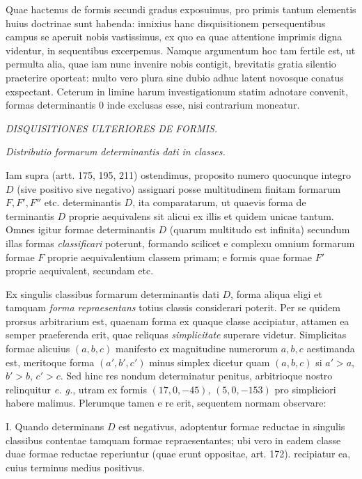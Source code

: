 Quae hactenus de formis secundi gradus exposuimus, pro primis tantum elementis
huius doctrinae sunt habenda: innixius hanc disquisitionem persequentibus campus
se aperuit nobis vastissimus, ex quo ea quae attentione imprimis digna videntur,
in sequentibus excerpemus. Namque argumentum hoc tam fertile est, ut permulta alia,
quae iam nunc invenire nobis contigit, brevitatis gratia silentio praeterire
oporteat: multo vero plura sine dubio adhuc latent novosque conatus exspectant.
Ceterum in limine harum investigationum statim adnotare convenit, formas
determinantis $0$ inde exclusas esse, nisi contrarium moneatur.

\begin{center}
\textit{DISQUISITIONES ULTERIORES DE FORMIS.}
\end{center}

\begin{center}
\textit{Distributio formarum determinantis dati in classes.}
\end{center}

Iam supra (artt. 175, 195, 211) ostendimus, proposito numero quocunque integro
$D$ (sive positivo sive negativo) assignari posse multitudinem finitam formarum
$F,F',F''$ etc. determinantis $D$, ita comparatarum, ut quaevis forma de%
%
terminantis $D$ proprie aequivalens sit alicui ex illis et quidem unicae tantum.
Omnes igitur formae determinantis $D$ (quarum multitudo est infinita) secundum
illas formas \textit{classificari} poterunt, formando scilicet e complexu omnium
formarum formae $F$ proprie aequivalentium classem primam; e formis quae formae
$F'$ proprie aequivalent, secundam etc.

Ex singulis classibus formarum determinantis dati $D$, forma aliqua eligi et
tamquam \textit{forma repraesentans} totius classis considerari poterit. Per se
quidem prorsus arbitrarium est, quaenam forma ex quaque classe accipiatur, attamen
ea semper praeferenda erit, quae reliquas \textit{simplicitate} superare videtur.
Simplicitas formae alicuius $(a,b,c)$ manifesto ex magnitudine numerorum
$a,b,c$ aestimanda est, meritoque forma $(a',b',c')$ minus simplex dicetur
quam $(a,b,c)$ si $a'>a$, $b'>b$, $c'>c$. Sed hinc res nondum
determinatur penitus, arbitrioque nostro relinquitur \textit{e. g.}, utram ex
formis $(17,0,-45)$, $(5,0,-153)$ pro simpliciori habere malimus.
Plerumque tamen e re erit, sequentem normam observare:

I. Quando determinans $D$ est negativus, adoptentur formae reductae in singulis
classibus contentae tamquam formae repraesentantes; ubi vero in eadem classe duae
formae reductae reperiuntur (quae erunt oppositae, art. 172). recipiatur ea,
cuius terminus medius positivus.


